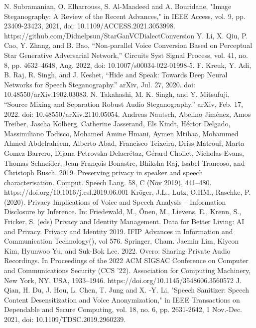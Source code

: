 \documentclass[journal]{IEEEtran} %
\begin{document}
\begin{thebibliography}{00}
     N. Subramanian, O. Elharrouss, S. Al-Maadeed and A. Bouridane, "Image Steganography: A Review of the Recent Advances," in IEEE Access, vol. 9, pp. 23409-23423, 2021, doi: 10.1109/ACCESS.2021.3053998.
     https://github.com/Didnelpsun/StarGanVCDialectConversion
     Y. Li, X. Qiu, P. Cao, Y. Zhang, and B. Bao, “Non-parallel Voice Conversion Based on Perceptual Star Generative Adversarial Network,” Circuits Syst Signal Process, vol. 41, no. 8, pp. 4632–4648, Aug. 2022, doi: 10.1007/s00034-022-01998-5.
     F. Kreuk, Y. Adi, B. Raj, R. Singh, and J. Keshet, “Hide and Speak: Towards Deep Neural Networks for Speech Steganography.” arXiv, Jul. 27, 2020. doi: 10.48550/arXiv.1902.03083.
     N. Takahashi, M. K. Singh, and Y. Mitsufuji, “Source Mixing and Separation Robust Audio Steganography.” arXiv, Feb. 17, 2022. doi: 10.48550/arXiv.2110.05054.
     Andreas Nautsch, Abelino Jiménez, Amos Treiber, Jascha Kolberg, Catherine Jasserand, Els Kindt, Héctor Delgado, Massimiliano Todisco, Mohamed Amine Hmani, Aymen Mtibaa, Mohammed Ahmed Abdelraheem, Alberto Abad, Francisco Teixeira, Driss Matrouf, Marta Gomez-Barrero, Dijana Petrovska-Delacrétaz, Gérard Chollet, Nicholas Evans, Thomas Schneider, Jean-François Bonastre, Bhiksha Raj, Isabel Trancoso, and Christoph Busch. 2019. Preserving privacy in speaker and speech characterisation. Comput. Speech Lang. 58, C (Nov 2019), 441–480. https://doi.org/10.1016/j.csl.2019.06.001
     Kröger, J.L., Lutz, O.HM., Raschke, P. (2020). Privacy Implications of Voice and Speech Analysis – Information Disclosure by Inference. In: Friedewald, M., Önen, M., Lievens, E., Krenn, S., Fricker, S. (eds) Privacy and Identity Management. Data for Better Living: AI and Privacy. Privacy and Identity 2019. IFIP Advances in Information and Communication Technology(), vol 576. Springer, Cham.
     Jaemin Lim, Kiyeon Kim, Hyunwoo Yu, and Suk-Bok Lee. 2022. Overo: Sharing Private Audio Recordings. In Proceedings of the 2022 ACM SIGSAC Conference on Computer and Communications Security (CCS '22). Association for Computing Machinery, New York, NY, USA, 1933–1946. https://doi.org/10.1145/3548606.3560572
     J. Qian, H. Du, J. Hou, L. Chen, T. Jung and X. -Y. Li, "Speech Sanitizer: Speech Content Desensitization and Voice Anonymization," in IEEE Transactions on Dependable and Secure Computing, vol. 18, no. 6, pp. 2631-2642, 1 Nov.-Dec. 2021, doi: 10.1109/TDSC.2019.2960239.

\end{thebibliography}
\end{document}
